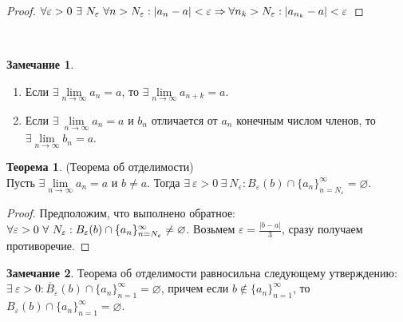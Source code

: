\documentclass[a4paper, 12pt]{article}
\newcommand{\Z}{\mathbb{Z}}
\newcommand{\R}{\mathbb{R}}
\renewcommand{\epsilon}{\varepsilon}
\renewcommand{\emptyset}{\varnothing}
\newcommand\tab[1][.5cm]{\hspace*{#1}}
\newcommand{\lims}{\lim\limits_{n\to \infty}}
\theoremstyle{definition}
\newtheorem*{theorem}{Теорема}
\newtheorem*{comm}{Замечание}
\begin{document}
        \begin{proof}
            $\forall \epsilon>0\ \exists\ N_{\epsilon}\ \forall n>N_{\epsilon}: |a_n-a|<\epsilon \Rightarrow \forall n_k>N_{\epsilon}:\\ |a_{n_k}-a|<\epsilon$
        \end{proof} 
        \
        \begin{comm}\tab
            \begin{enumerate}
                \item Если $\exists \lims a_n=a$, то $\exists \lims a_{n+k}=a$.
                \item Если $\exists\ \lims a_n=a$ и $b_n$ отличается от $a_n$ конечным числом членов, то $\exists \lims b_n=a$.
            \end{enumerate}
        \end{comm} 
        \begin{theorem} (Теорема об отделимости)\\
            Пусть $\exists \lims a_n=a$ и $b\ne a$. Тогда $\exists\ \epsilon>0\ \exists\ N_{\epsilon}: B_{\epsilon}(b)\cap \{a_n\}_{n=N_{\epsilon}}^{\infty}=\emptyset$.
        \end{theorem} 
        \begin{proof}
            Предположим, что выполнено обратное: $\forall \epsilon>0\ \forall \ N_{\epsilon}:\\
            B_{\epsilon}(b)\cap \{a_n\}_{n=N_{\epsilon}}^{\infty}\ne \emptyset$. Возьмем $\epsilon = \frac{|b-a|}{3}$, сразу получаем противоречие.
        \end{proof} 
        \begin{comm}
            Теорема об отделимости равносильна следующему утверждению: $\exists\ \epsilon>0: \mathring{B_{\epsilon}}(b)\cap \{a_n\}_{n=1}^{\infty}=\emptyset$, причем если $b\notin \{a_n\}_{n=1}^{\infty}$, то $B_{\epsilon}(b)\cap\{a_n\}_{n=1}^{\infty}=\emptyset$.
        \end{comm} 
\end{document}
